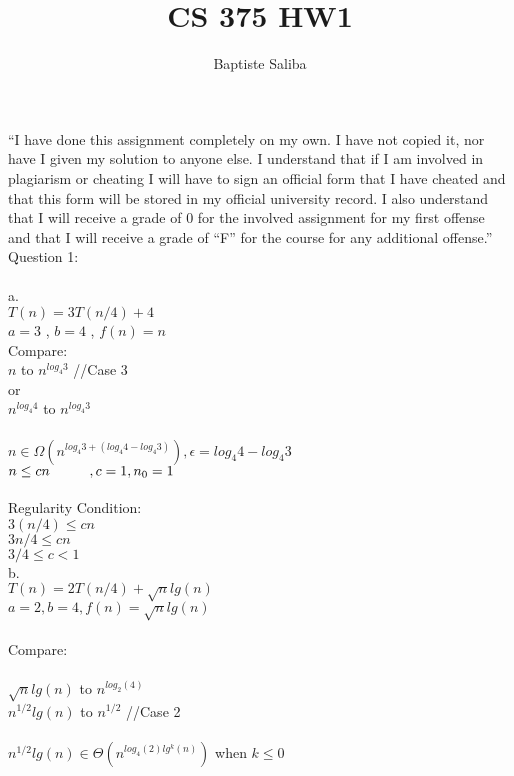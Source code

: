 \documentclass[12pt]{article}
\title{CS 375 HW1}
\author{Baptiste Saliba}
\newcommand\tab[1][1cm]{\hspace*{#1}}
\begin{document}
\large
\maketitle
“I have done this assignment completely on my own. I have not copied it, nor have I given my solution to anyone else. I understand that if I am involved in plagiarism or cheating I will have to sign an official form that I have cheated and that this form will be stored in my official university record. I also understand that I will receive a grade of 0 for the involved assignment for my first offense and that I will receive a grade of “F” for the course for any additional offense.”\\
\vspace{20mm}
\vfill
Question 1: \\\\
a. \\
\tab\tab$T(n) = 3T(n/4)+4$\\
\tab\tab\tab $a = 3$ , $b=4$ , $f(n) = n$\\
\tab\tab Compare:\\
\tab\tab $n$ to $n^{log_4 3}$ //Case 3\\
\tab\tab\tab or \\
\tab\tab $n^{log_4 4}$ to $n^{log_4 3}$\\\\
\tab\tab $n\in\Omega(n^{log_4 3 +(log_4 4 - log_4 3)}) , \epsilon = log_4 4 - log_4 3$\\
\tab\tab $n\leq cn \tab  ,c = 1 ,  n_0 =1 $\\\\
\tab\tab Regularity Condition: \\
\tab\tab $3(n/4) \leq cn$\\
\tab\tab $3n/4 \leq cn$ \\
\tab\tab $3/4 \leq c<1$\\
b. \\
\tab\tab $T(n) = 2T(n/4)+ \sqrt n lg(n)$\\
\tab\tab $a=2 , b=4 , f(n) = \sqrt n lg(n)$\\\\
\tab\tab Compare:\\\\
\tab\tab $\sqrt n lg(n)$ to $n^{log_2 (4)}$\\
\tab\tab $n^{1/2} lg(n)$ to $n^{1/2} $ //Case 2\\\\
\tab\tab $n^{1/2} lg(n) \in \Theta (n^{log_4 (2) lg^k (n)})$ \tab when $k\leq 0$\\
\end{document}
